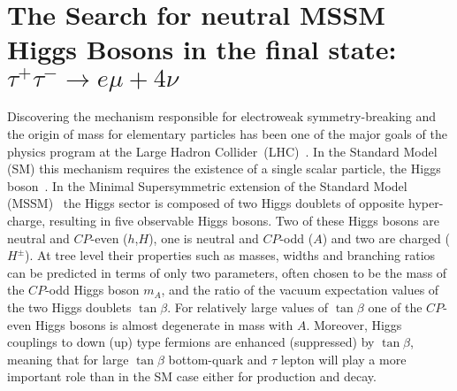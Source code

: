 \chapter{The Search for neutral MSSM Higgs Bosons in the final state:
$\tau^{+}\tau^{-} \rightarrow e \mu + 4\nu$}

Discovering the mechanism responsible for electroweak
symmetry-breaking and the origin of mass for elementary particles has been
one of the major goals of the physics program at the Large Hadron
Collider~(LHC)~\cite{LHC}.  In the Standard Model (SM) this mechanism
requires the existence of a single scalar particle, the Higgs
boson~\cite{ENGLERT,HIGGS,HIGGS2,HIGGS3,Guralnik:1964eu}.
In the Minimal Supersymmetric extension of the Standard Model
(MSSM)~\cite{MSSM1, MSSM2} the Higgs sector is composed of two Higgs
doublets of opposite hyper-charge, resulting in five observable Higgs
bosons.  Two of these Higgs bosons are neutral and $CP$-even
($h$,$H$), one is neutral and $CP$-odd ($A$) and two are charged
($H^\pm$).  At tree level their properties such as masses, widths and
branching ratios can be predicted in terms of only two parameters,
often chosen to be the mass of the $CP$-odd Higgs boson $m_A$, and
the ratio of the vacuum expectation values of the two Higgs doublets
$\tan\beta$.  For relatively large values of $\tan\beta$ one of the
$CP$-even Higgs bosons is almost degenerate in mass with
$A$. Moreover, Higgs couplings to down (up) type fermions are enhanced
(suppressed) by $\tan\beta$, meaning that for large $\tan\beta$
bottom-quark and $\tau$ lepton will play a more important role than in
the SM case either for production and decay.

